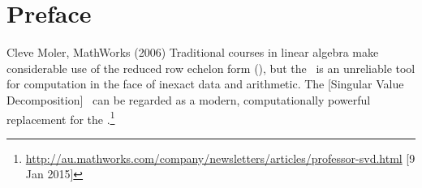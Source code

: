 
\maketitle

\begin{comment}
\addtocounter{page}{-1}
In this draft, the blue text comments such as this are notes to developers about related references, about reasons for decisions, about more exercises, about possible future extensions, and so on.
Such comments are not intended for the published version, they are only notes for myself and developers.
\begin{quoted}{George Cobb, 2007}
the consensus curriculum is still an unwitting prisoner of history
\end{quoted}


Outstanding tasks for a first version include:
\begin{itemize}
\item finalising the scope of the book and of applications;
\item exercises on computing that do not require a computer, e.g., interpretation;
\item checking the staged use of abstract symbolism; 
\item potentially more applications that involve `real' data, especially in Chapter~5 on approximating matrices;
\item adapt information, especially some uses of the SVD, from the book by Mark Holmes (2016) ``Introduction to scientific computing and data analysis'' Springer;
\item refining the index;
\item possibly concept maps;
\item short videos of procedures, examples, proofs.
\end{itemize}
\end{comment}



\tableofcontents


\chapter*{Preface}


\begin{quoted}{Cleve Moler, MathWorks (2006)}
Traditional courses in linear algebra make considerable use of the 
{reduced row echelon form} (\rref), but the \rref\ is an unreliable tool for computation in the face of inexact data and arithmetic. 
The [Singular Value Decomposition] \svd\ can be regarded as a modern, computationally powerful replacement for the \rref.\footnote{\url{http://au.mathworks.com/company/newsletters/articles/professor-svd.html} [9 Jan 2015]}
\end{quoted}

